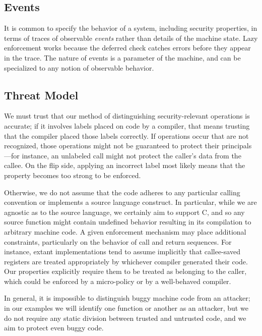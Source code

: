 
\subsection{Events}

It is common to specify the behavior of a system, including security properties, in
terms of traces of observable {\em events} rather than details of the machine state.
Lazy enforcement works because the deferred check catches errors before they appear
in the trace. The nature of events is a parameter of the machine, and can be specialized
to any notion of observable behavior.

\subsection{Threat Model}

We must trust that our method of distinguishing security-relevant operations is accurate; if it
involves labels placed on code by a compiler, that means trusting that the compiler placed
those labels correctly. If operations occur that are not recognized, those operations
might not be guaranteed to protect their principals---for instance, an unlabeled call
might not protect the caller's data from the callee. On the flip side, applying an incorrect
label most likely means that the property becomes too strong to be enforced.

Otherwise, we do not assume that the code adheres to any particular
calling convention or implements a source language construct.
In particular, while we are agnostic as to the source
language, we certainly aim to support C, and so any source function might contain undefined
behavior resulting in its compilation to arbitrary machine code. A given enforcement
mechanism may place additional constraints, particularly on the behavior of
call and return sequences. For instance, extant implementations tend to assume
implicitly that callee-saved registers are treated appropriately by whichever compiler
generated their code. Our properties explicitly require them to be treated as belonging
to the caller, which could be enforced by a micro-policy or by a well-behaved compiler.

In general, it is impossible to distinguish buggy machine code from an attacker; in
our examples we will identify one function or another as an attacker, but we do not
require any static division between trusted and untrusted code, and we aim to protect
even buggy code.

